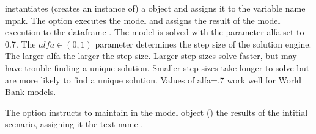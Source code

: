 \documentclass[letterpaper,10pt,english]{jupyterBook}
\begin{document}
\sphinxAtStartPar
instantiates (creates an instance of) a  object and assigns it to the variable name mpak.  The  option executes the model and assigns the result of the model execution to the dataframe .  The model is solved with the parameter alfa set to 0.7.  The \(alfa \in (0,1)\) parameter determines the step size of the solution engine. The larger alfa the larger the step size. Larger step sizes solve faster, but may have trouble finding a unique solution.  Smaller step sizes take longer to solve but are more likely to find a unique solution.  Values of alfa=.7 work well for World Bank models.

\sphinxAtStartPar
The  option instructs  to maintain in the model object () the results of the intitial scenario, assigning it the text name .
\end{document}
